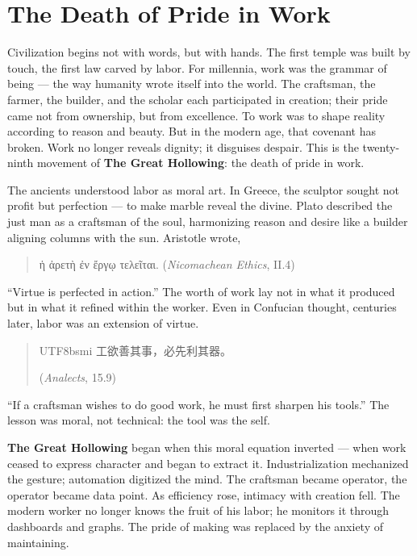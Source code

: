 \documentclass[11pt,twoside]{book}
\begin{document}
% 
\chapter{The Death of Pride in Work}
\label{ch:32}

Civilization begins not with words, but with hands.  
The first temple was built by touch, the first law carved by labor.  
For millennia, work was the grammar of being — the way humanity wrote itself into the world.  
The craftsman, the farmer, the builder, and the scholar each participated in creation; their pride came not from ownership, but from excellence.  
To work was to shape reality according to reason and beauty.  
But in the modern age, that covenant has broken.  
Work no longer reveals dignity; it disguises despair.  
This is the twenty-ninth movement of \textbf{The Great Hollowing}: the death of pride in work.

\bigskip

The ancients understood labor as moral art.  
In Greece, the sculptor sought not profit but perfection — to make marble reveal the divine.  
Plato described the just man as a craftsman of the soul, harmonizing reason and desire like a builder aligning columns with the sun.  
Aristotle wrote,  
\begin{quote}
\foreignlanguage{greek}{ἡ ἀρετὴ ἐν ἔργῳ τελεῖται.}  
(\textit{Nicomachean Ethics}, II.4)  
\end{quote}
“Virtue is perfected in action.”  
The worth of work lay not in what it produced but in what it refined within the worker.  
\clearpage
Even in Confucian thought, centuries later, labor was an extension of virtue.  
\begin{quote}
\begin{CJK*}{UTF8}{bsmi}
工欲善其事，必先利其器。
\end{CJK*}  
(\textit{Analects}, 15.9)
\end{quote}
“If a craftsman wishes to do good work, he must first sharpen his tools.”  
The lesson was moral, not technical: the tool was the self.

\textbf{The Great Hollowing} began when this moral equation inverted — when work ceased to express character and began to extract it.  
Industrialization mechanized the gesture; automation digitized the mind.  
The craftsman became operator, the operator became data point.  
As efficiency rose, intimacy with creation fell.  
The modern worker no longer knows the fruit of his labor; he monitors it through dashboards and graphs.  
The pride of making was replaced by the anxiety of maintaining.
\end{document}
